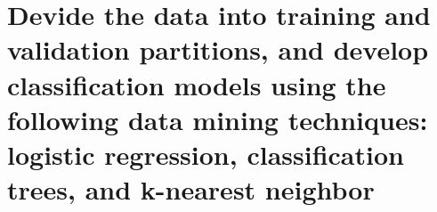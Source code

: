 \section{Devide the data into training and validation partitions, and develop classification models using the following data mining techniques: logistic regression, classification trees, and k-nearest neighbor}